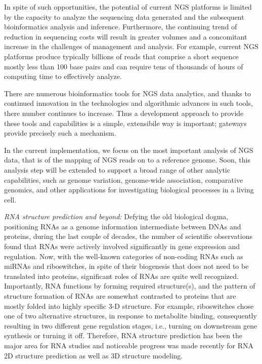 \documentclass{sig-alternate}
\begin{document}
In spite of such opportunities, the potential of current NGS platforms
is limited by the capacity to analyze the sequencing data generated
and the subsequent bioinformatics analysis and inference. Furthermore,
the continuing trend of reduction in sequencing costs will result in
greater volumes and a concomitant increase in the challenges of
management and analysis.  For example, current NGS platforms produce
typically billions of reads that comprise a short sequence mostly less
than 100 base pairs\cite{alex2009} and can require tens of thousands
of hours of computing time to effectively analyze.


There are numerous bioinformatics tools for NGS data analytics, and
thanks to continued innovation in the technologies and algorithmic
advances in such tools, there number continues to increase.  Thus a
development approach to provide these tools and capabilities is a
simple, extensibile way is important; gateways provide precisely such
a mechanism.

In the current implementation, we focus on the most important analysis
of NGS data, that is of the mapping of NGS reads on to a reference
genome.  Soon, this analysis step will be extended to support a broad
range of other analytic capabilities, such as genome variation,
genome-wide association, comparative genomics, and other applications
for investigating biological processes in a living cell.

\textit{RNA structure prediction and beyond:} Defying the old
biological dogma, positioning RNAs as a genome information
intermediate between DNAs and proteins, during the last couple of
decades, the number of scientific observations found that RNAs were
actively involved significantly in gene expression and
regulation\cite{joyce1999}. %
Now, with the well-known categories of non-coding RNAs such as miRNAs
and riboswitches, in spite of their biogenesis that does not need to
be translated into proteins, significant roles of RNAs are quite well
recognized\cite{costa2009}.
Importantly, RNA functions by forming required structure(s), and the
pattern of structure formation of RNAs are somewhat contrasted to
proteins that are mostly folded into highly specific 3-D
structure\cite{roth2009}. For example, riboswitches chose one of two
alternative structures, in response to metabolite binding,
consequently resulting in two different gene regulation stages, i.e.,
turning on downstream gene synthesis or turning it
off\cite{montange2008}.  Therefore, RNA structure prediction has been
the major area for RNA studies and noticeable progress was made
recently for RNA 2D structure prediction as well as 3D structure
modeling\cite{shapiro2007}.
\end{document}
